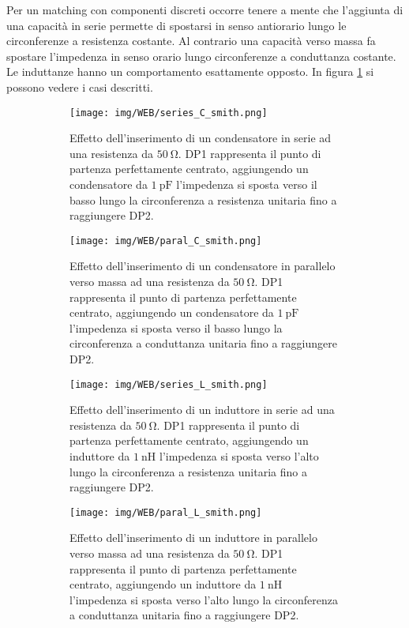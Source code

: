 \documentclass[12pt,oneside]{book}
\begin{document}
Per un matching con componenti discreti occorre tenere a mente che l'aggiunta di una capacità in serie permette di spostarsi in senso antiorario lungo le circonferenze a resistenza costante. Al contrario una capacità verso massa fa spostare l'impedenza in senso orario lungo circonferenze a conduttanza costante. Le induttanze hanno un comportamento esattamente opposto. In figura \ref{smith_ser_par} si possono vedere i casi descritti.

\begin{figure}[!htbp]
    \centering
    \begin{subfigure}[t]{0.48\textwidth}
        \centering
        \texttt{[image: img/WEB/series\_C\_smith.png]}
        \caption{Effetto dell'inserimento di un condensatore in serie ad una resistenza da $\SI{50}{\ohm}$. DP1 rappresenta il punto di partenza perfettamente centrato, aggiungendo un condensatore da $\SI{1}{\pico\farad}$ l'impedenza si sposta verso il basso lungo la circonferenza a resistenza unitaria fino a raggiungere DP2.}
    \end{subfigure}
    \hfill
    \begin{subfigure}[t]{0.48\textwidth}
        \centering
        \texttt{[image: img/WEB/paral\_C\_smith.png]}
        \caption{Effetto dell'inserimento di un condensatore in parallelo verso massa ad una resistenza da $\SI{50}{\ohm}$. DP1 rappresenta il punto di partenza perfettamente centrato, aggiungendo un condensatore da $\SI{1}{\pico\farad}$ l'impedenza si sposta verso il basso lungo la circonferenza a conduttanza unitaria fino a raggiungere DP2.}
    \end{subfigure}
    \hfill
    \begin{subfigure}[t]{0.48\textwidth}
        \centering
        \texttt{[image: img/WEB/series\_L\_smith.png]}
        \caption{Effetto dell'inserimento di un induttore in serie ad una resistenza da $\SI{50}{\ohm}$. DP1 rappresenta il punto di partenza perfettamente centrato, aggiungendo un induttore da $\SI{1}{\nano\henry}$ l'impedenza si sposta verso l'alto lungo la circonferenza a resistenza unitaria fino a raggiungere DP2.}
    \end{subfigure}
    \hfill
    \begin{subfigure}[t]{0.48\textwidth}
        \centering
        \texttt{[image: img/WEB/paral\_L\_smith.png]}
        \caption{Effetto dell'inserimento di un induttore in parallelo verso massa ad una resistenza da $\SI{50}{\ohm}$. DP1 rappresenta il punto di partenza perfettamente centrato, aggiungendo un induttore da $\SI{1}{\nano\henry}$ l'impedenza si sposta verso l'alto lungo la circonferenza a conduttanza unitaria fino a raggiungere DP2.}
    \end{subfigure}
    \caption{}
    \label{smith_ser_par}
\end{figure}
\end{document}
